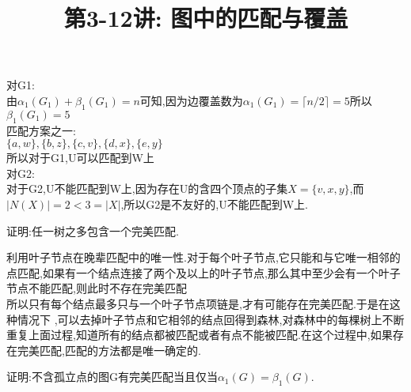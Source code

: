 \documentclass[a4paper, justified]{tufte-handout}
\title{第3-12讲: 图中的匹配与覆盖}
\date{\zhtoday} %
\begin{document}
\maketitle
\noplagiarism %
\begin{abstract}
\end{abstract}
\beginrequired

\begin{problem}[CZ 8.3]
\end{problem}

\begin{solution}
  对G1:\\
  由$\alpha_1(G_1)+\beta_1(G_1) = n$可知,因为边覆盖数为$\alpha_1(G_1)=\lceil n/2 \rceil=5$所以$\beta_1(G_1)=5$\\
  匹配方案之一:\\
  $\{a,w\},\{b,z\},\{c,v\},\{d,x\},\{e,y\}$\\
  所以对于G1,U可以匹配到W上\\
  对G2:\\
  对于G2,U不能匹配到W上,因为存在U的含四个顶点的子集$X=\{v,x,y\}$,而$|N(X)| = 2 < 3 = |X|$,所以G2是不友好的,U不能匹配到W上.
\end{solution}

\begin{problem}[CZ 8.5]
证明:任一树之多包含一个完美匹配.
\end{problem}

\begin{solution}
  利用叶子节点在晚辈匹配中的唯一性.对于每个叶子节点,它只能和与它唯一相邻的点匹配,如果有一个结点连接了两个及以上的叶子节点,那么其中至少会有一个叶子节点不能匹配,则此时不存在完美匹配\\
  所以只有每个结点最多只与一个叶子节点项链是,才有可能存在完美匹配.于是在这种情况下 ,可以去掉叶子节点和它相邻的结点回得到森林,对森林中的每棵树上不断重复上面过程,知道所有的结点都被匹配或者有点不能被匹配.在这个过程中,如果存在完美匹配,匹配的方法都是唯一确定的.
\end{solution}

\begin{problem}[CZ 8.14]
证明:不含孤立点的图G有完美匹配当且仅当$\alpha_1(G)=\beta_1(G)$.
\end{problem}
\end{document}
